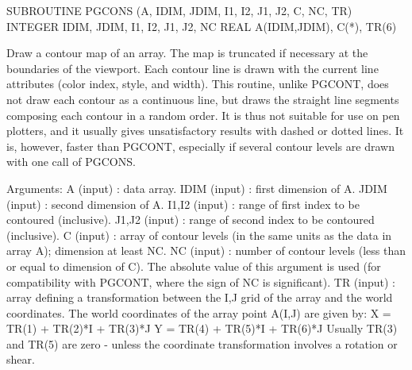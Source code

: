 {\eightpoint\begintt
      SUBROUTINE PGCONS (A, IDIM, JDIM, I1, I2, J1, J2, C, NC, TR)
      INTEGER IDIM, JDIM, I1, I2, J1, J2, NC
      REAL    A(IDIM,JDIM), C(*), TR(6)
 
Draw a contour map of an array. The map is truncated if
necessary at the boundaries of the viewport.  Each contour line is
drawn with the current line attributes (color index, style, and
width).  This routine, unlike PGCONT, does not draw each contour as a
continuous line, but draws the straight line segments composing each
contour in a random order.  It is thus not suitable for use on pen
plotters, and it usually gives unsatisfactory results with dashed or
dotted lines.  It is, however, faster than PGCONT, especially if
several contour levels are drawn with one call of PGCONS.
 
Arguments:
 A      (input)  : data array.
 IDIM   (input)  : first dimension of A.
 JDIM   (input)  : second dimension of A.
 I1,I2  (input)  : range of first index to be contoured (inclusive).
 J1,J2  (input)  : range of second index to be contoured (inclusive).
 C      (input)  : array of contour levels (in the same units as the
                   data in array A); dimension at least NC.
 NC     (input)  : number of contour levels (less than or equal to
                   dimension of C). The absolute value of this
                   argument is used (for compatibility with PGCONT,
                   where the sign of NC is significant).
 TR     (input)  : array defining a transformation between the I,J
                   grid of the array and the world coordinates. The
                   world coordinates of the array point A(I,J) are
                   given by:
                     X = TR(1) + TR(2)*I + TR(3)*J
                     Y = TR(4) + TR(5)*I + TR(6)*J
                   Usually TR(3) and TR(5) are zero - unless the
                   coordinate transformation involves a rotation
                   or shear.
\endtt}

